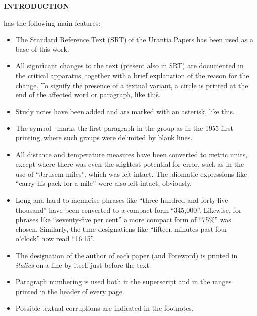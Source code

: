\newpage
\thispagestyle{empty}

\makeatletter
{}%
\makeatother

\begin{center}
\LARGE\bfseries
INTRODUCTION
\end{center}


 has the following main features:

\begin{itemize}
\item The Standard Reference Text (SRT) of the Urantia Papers has been used as a base of this work.
\item All significant changes to the text (present also in SRT) are documented in the critical apparatus, together with a brief explanation of the reason for the change. To signify the presence of a textual variant, a circle is printed at the end of the affected word or paragraph, like this\r{}.
\item Study notes have been added and are marked with an asterisk, like this\ts{*}.
\item The symbol \pc\ marks the first paragraph in the group as in the 1955 first printing, where such groups were delimited by blank lines.
\item All distance and temperature measures have been converted to metric units, except where there was even the slightest potential for error, such as in the use of ``Jerusem miles'', which was left intact. The idiomatic expressions like ``carry his pack for a mile'' were also left intact, obviously.
\item Long and hard to memorise phrases like ``three hundred and forty\hyp{}five thousand'' have been converted to a compact form ``345,000''. Likewise, for phrases like ``seventy\hyp{}five per cent'' a more compact form of ``75\%'' was chosen. Similarly, the time designations like ``fifteen minutes past four o’clock'' now read ``16:15''.
\item The designation of the author of each paper (and Foreword) is printed in \textit{italics} on a line by itself just before the text.
\item Paragraph numbering is used both in the superscript and in the ranges printed in the head\-er of every page.
\item Possible textual corruptions are indicated in the footnotes.
\end{itemize}

